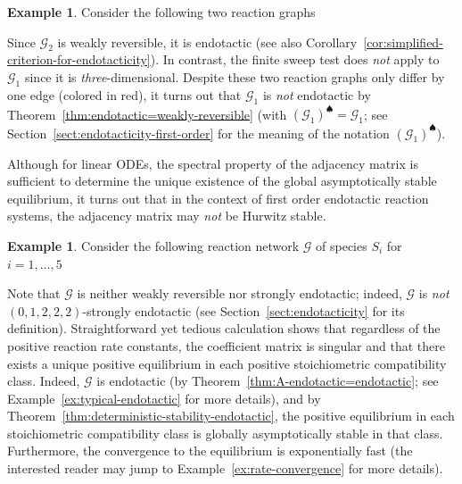 \documentclass[10pt]{amsart}
\numberwithin{equation}{section}
\theoremstyle{plain}
\theoremstyle{definition}
\newtheorem{example}[theorem]{Example}
\theoremstyle{remark}
\newcommand{\cG}{\mathcal{G}}
\begin{document}
\begin{example}
 Consider the following two reaction graphs
\begin{center}
\end{center}
Since $\cG_2$ is weakly reversible, it is endotactic \cite{CNP13} (see also Corollary~\ref{cor:simplified-criterion-for-endotacticity}). In contrast, the finite sweep test \cite[Proposition~4.1]{CNP13} does \emph{not} apply to $\cG_1$ since it is \emph{three}-dimensional. Despite these two reaction graphs only differ by one edge (colored in red), it turns out that $\cG_1$ is \emph{not} endotactic by Theorem~\ref{thm:endotactic=weakly-reversible} (with $(\cG_1)^{\spadesuit} = \cG_1$; see Section~\ref{sect:endotacticity-first-order} for the meaning of the notation $(\cG_1)^{\spadesuit}$). 
\end{example}
Although for linear ODEs, the  spectral property of the adjacency matrix is sufficient to determine the unique existence of the global asymptotically stable equilibrium,  it turns out that in the context of first order endotactic reaction systems, the adjacency matrix may \emph{not} be Hurwitz stable. 
\begin{example}\label{ex:Introductory-example}
Consider the following reaction network $\cG$ of species $S_i$ for $i=1,\ldots,5$
\begin{center}
\end{center}
{Note that  $\cG$ is neither weakly reversible nor strongly endotactic;  indeed, $\cG$ is \emph{not} $(0,1,2,2,2)$-strongly endotactic (see Section~\ref{sect:endotacticity} for its definition). 
Straightforward yet tedious calculation shows that regardless of the positive reaction rate constants, the coefficient matrix is singular and that there exists a unique positive equilibrium in each positive stoichiometric compatibility class.   
Indeed, $\cG$ is endotactic (by Theorem~\ref{thm:A-endotactic=endotactic}; see Example~\ref{ex:typical-endotactic} for more details), and
by Theorem~\ref{thm:deterministic-stability-endotactic},
 the positive equilibrium in each stoichiometric compatibility class is globally asymptotically stable in that class. Furthermore, the convergence to the equilibrium is exponentially fast (the interested reader may jump to Example~\ref{ex:rate-convergence} for more details).}
\end{example}
\end{document}
